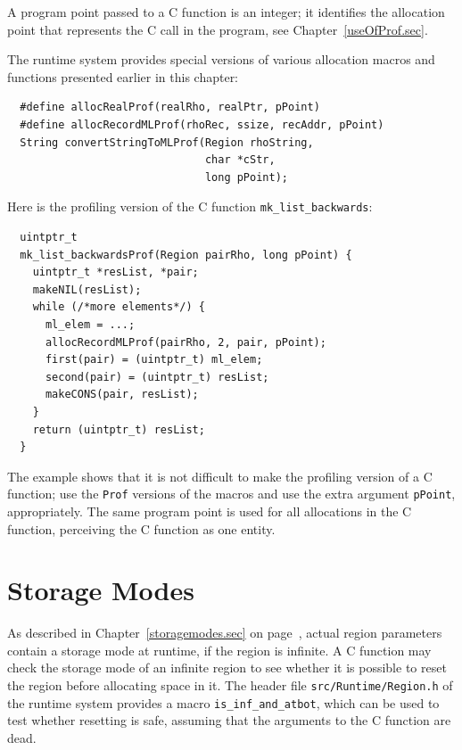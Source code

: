 \documentclass[12pt]{book}
\begin{document}
A program point passed to a C function is an integer; it identifies the
allocation point that represents the C call in the program, see
Chapter~\ref{useOfProf.sec}.

The runtime system provides special versions of various allocation
macros and functions presented earlier in this chapter:
%
%
%
\begin{verbatim}
  #define allocRealProf(realRho, realPtr, pPoint)
  #define allocRecordMLProf(rhoRec, ssize, recAddr, pPoint)
  String convertStringToMLProf(Region rhoString,
                               char *cStr,
                               long pPoint);
\end{verbatim}

Here is the profiling version of the C function
\verb|mk_list_backwards|:
\begin{verbatim}
  uintptr_t
  mk_list_backwardsProf(Region pairRho, long pPoint) {
    uintptr_t *resList, *pair;
    makeNIL(resList);
    while (/*more elements*/) {
      ml_elem = ...;
      allocRecordMLProf(pairRho, 2, pair, pPoint);
      first(pair) = (uintptr_t) ml_elem;
      second(pair) = (uintptr_t) resList;
      makeCONS(pair, resList);
    }
    return (uintptr_t) resList;
  }
\end{verbatim}
The example shows that it is not difficult to make the profiling
version of a C function; use the \texttt{Prof} versions of the
macros and use the extra argument \texttt{pPoint}, appropriately. The
same program point is used for all allocations in the C function,
perceiving the C function as one entity.

\section{Storage Modes}
As described in Chapter~\ref{storagemodes.sec} on
page~\pageref{atbit.lab}, actual region parameters contain a storage
mode at runtime, if the region is infinite.  A C function may check
the storage mode of an infinite region to see whether it is possible
to reset the region before allocating space in it. The header file
{\tt src/Runtime/Region.h} of the runtime system provides a macro
%
\verb|is_inf_and_atbot|, which can be used to test whether resetting
is safe, assuming that the arguments to the C function are dead.
\end{document}
